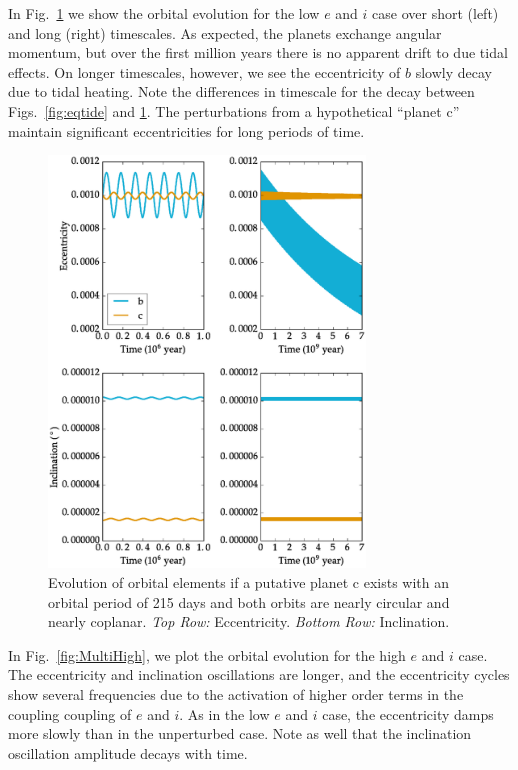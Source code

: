 \documentclass[preprint,12pt]{aastex}
\begin{document}
In Fig.~\ref{fig:MultiLow} we show the orbital evolution for the low
$e$ and $i$ case over short (left) and long (right) timescales. As
expected, the planets exchange angular momentum, but over the first
million years there is no apparent drift to due tidal effects. On
longer timescales, however, we see the eccentricity of $b$ slowly decay
due to tidal heating. Note the differences in timescale for the decay
between Figs.~\ref{fig:eqtide} and \ref{fig:MultiLow}. The
perturbations from a hypothetical ``planet c'' maintain significant
eccentricities for long periods of time.

\begin{figure} 
\begin{center}
\includegraphics[width=0.75\textwidth]{MultiLow2.eps}
\end{center}
\caption{Evolution of orbital elements if a putative planet c exists with an 
orbital period of 215 days and both orbits are nearly circular and nearly 
coplanar. {\it Top Row:} Eccentricity. {\it Bottom Row:} Inclination.}
\label{fig:MultiLow}
\end{figure}

In Fig.~\ref{fig:MultiHigh}, we plot the orbital evolution for the
high $e$ and $i$ case. The eccentricity and inclination oscillations
are longer, and the eccentricity cycles show several frequencies due
to the activation of higher order terms in the coupling coupling of $e$ and
$i$. As in the low $e$ and $i$ case, the eccentricity damps more
slowly than in the unperturbed case. Note as well that the inclination
oscillation amplitude decays with time.
\end{document}
